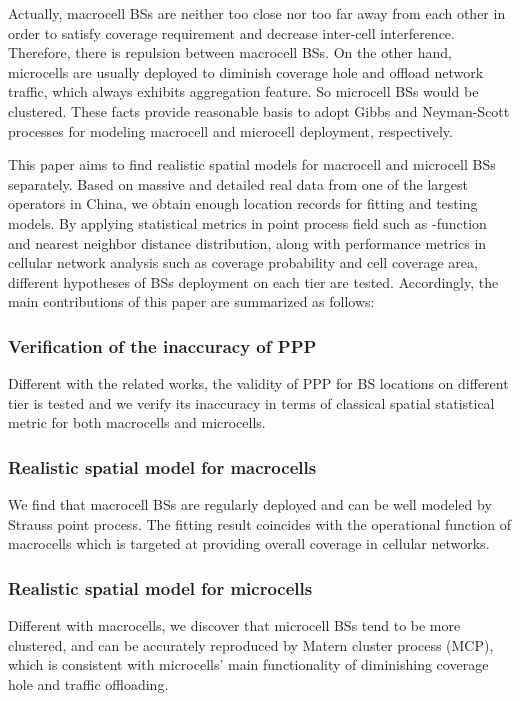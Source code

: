 \documentclass[conference]{IEEEtran}
\begin{document}
Actually, macrocell BSs are neither too close nor too far away from each other in order to satisfy coverage requirement and decrease inter-cell interference. Therefore, there is repulsion between macrocell BSs. On the other hand, microcells are usually deployed to diminish coverage hole and offload network traffic, which always exhibits aggregation feature. So microcell BSs would be clustered. These facts provide reasonable basis to adopt Gibbs and Neyman-Scott processes\cite{chiu2013stochastic} for modeling macrocell and microcell deployment, respectively.

This paper aims to find realistic spatial models for macrocell and microcell BSs separately. Based on massive and detailed real data from one of the largest operators in China, we obtain enough location records for fitting and testing models. By applying statistical metrics in point process field such as -function and nearest neighbor distance distribution\cite{ripley1991statistical}, along with performance metrics in cellular network analysis such as coverage probability and cell coverage area, different hypotheses of BSs deployment on each tier are tested. Accordingly, the main contributions of this paper are summarized as follows:
\subsubsection{\bf{Verification of the inaccuracy of PPP}}
Different with the related works, the validity of PPP for BS locations on different tier is tested and we verify its inaccuracy in terms of classical spatial statistical metric for both macrocells and microcells.
\subsubsection{\bf{Realistic spatial model for macrocells}}
We find that macrocell BSs are regularly deployed and can be well modeled by Strauss point process. The fitting result coincides with the operational function of macrocells which is targeted at providing overall coverage in cellular networks.
\subsubsection{\bf{Realistic spatial model for microcells}}
Different with macrocells, we discover that microcell BSs tend to be more clustered, and can be accurately reproduced by Matern cluster process (MCP), which is consistent with microcells' main functionality of diminishing coverage hole and traffic offloading.
\end{document}

